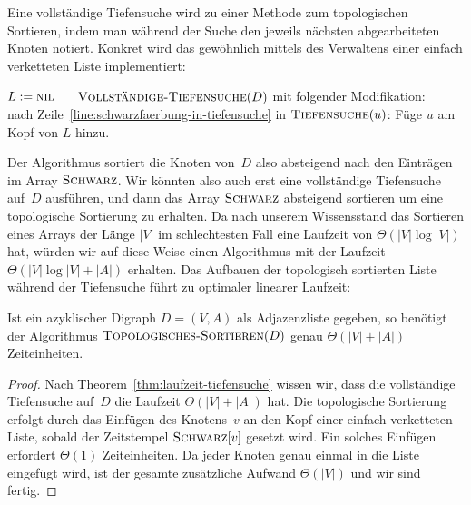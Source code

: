 \begin{bem} 
Eine vollständige Tiefensuche wird zu einer Methode zum topologischen Sortieren, indem man während der Suche den jeweils nächsten abgearbeiteten Knoten notiert.
Konkret wird das gewöhnlich mittels des Verwaltens einer einfach verketteten Liste implementiert:

\begin{algorithm}[H]
\caption{$\cc{Topologisches-Sortieren}(D)$}
 \begin{algorithmic}[1]
  \STATE $L:=\mathop{\text{\textsc{nil}}}$ $\quad$ 
  \STATE $\mathop{\text{\textsc{Vollständige-Tiefensuche}}}(D)$ mit folgender Modifikation:
  \STATE $\qquad$ nach Zeile~\ref{line:schwarzfaerbung-in-tiefensuche} in $\mathop{\text{\textsc{Tiefensuche}}}(u)$: Füge $u$ am Kopf von $L$ hinzu.
 \end{algorithmic}
\end{algorithm}
\end{bem} 

\begin{bem}
Der Algorithmus sortiert die Knoten von~$D$ also absteigend nach den Einträgen im Array $\mathop{\text{\textsc{Schwarz}}}$.
Wir könnten also auch erst eine vollständige Tiefensuche auf~$D$ ausführen, und dann das Array $\mathop{\text{\textsc{Schwarz}}}$ absteigend sortieren um eine topologische Sortierung zu erhalten.
Da nach unserem Wissensstand das Sortieren eines Arrays der Länge $|V|$ im schlechtesten Fall eine Laufzeit von $\Theta(|V|\log|V|)$ hat, würden wir auf diese Weise einen Algorithmus mit der Laufzeit $\Theta(|V|\log|V| + |A|)$ erhalten.
Das Aufbauen der topologisch sortierten Liste während der Tiefensuche führt zu optimaler linearer Laufzeit:
\end{bem} 

\begin{thm}
Ist ein azyklischer Digraph $D=(V,A)$ als Adjazenzliste gegeben, so benötigt der Algorithmus $\cc{Topologisches-Sortieren}(D)$ genau $\Theta(|V|+|A|)$ Zeiteinheiten.
\end{thm}

\begin{proof}
Nach Theorem~\ref{thm:laufzeit-tiefensuche} wissen wir, dass die vollständige Tiefensuche auf~$D$ die Laufzeit $\Theta(|V|+|A|)$ hat.
Die topologische Sortierung erfolgt durch das Einfügen des Knotens~$v$ an den Kopf einer einfach verketteten Liste, sobald der Zeitstempel $\mathop{\text{\textsc{Schwarz}}}[v]$ gesetzt wird.
Ein solches Einfügen erfordert $\Theta(1)$ Zeiteinheiten.
Da jeder Knoten genau einmal in die Liste eingefügt wird, ist der gesamte zusätzliche Aufwand $\Theta(|V|)$ und wir sind fertig.
\end{proof}

